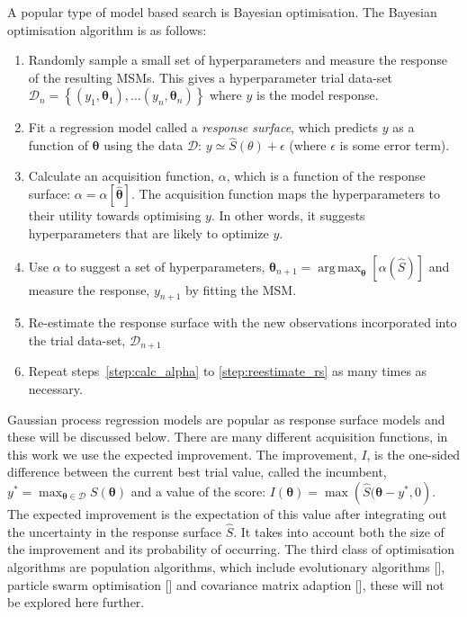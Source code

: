 \documentclass[journal=jacsat,manuscript=article]{achemso}
\DeclareMathOperator*{\argmax}{arg\,max}
\begin{document}
A popular type of model based search is Bayesian optimisation. The Bayesian optimisation algorithm is as follows: 
\begin{enumerate}
    \item Randomly sample a small set of hyperparameters and measure the response of the resulting MSMs. This gives a hyperparameter trial data-set $\mathcal{D}_{n}=\left\{(y_1, \bm{\theta}_1),  \ldots (y_n, \bm{\theta}_n) \right \}$ where $y$ is the model response.
    \item Fit a regression model called a \emph{response surface}, which predicts $y$ as a function of $\bm{\theta}$ using the data $\mathcal{D}$: $y \simeq \hat{S}(\theta) + \epsilon$ (where $\epsilon$ is some error term). 
    \item \label{step:calc_alpha} Calculate an acquisition function, $\alpha$, which is a function of the response surface: $\alpha=\alpha\left[\hat{\bm{\theta}}\right]$. The acquisition function maps the hyperparameters to their utility towards optimising $y$. In other words, it suggests hyperparameters that are likely to optimize $y$. 
    \item Use $\alpha$ to suggest a set of hyperparameters, $\bm{\theta}_{n+1} = \argmax_{\bm{\theta}}{\left[\alpha(\hat{S})\right]}$ and measure the response, $y_{n+1}$ by fitting the MSM.  
    \item \label{step:reestimate_rs} Re-estimate the response surface with the new observations incorporated into the trial data-set, $\mathcal{D}_{n+1}$
    \item Repeat steps~\ref{step:calc_alpha} to \ref{step:reestimate_rs} as many times as necessary. 
\end{enumerate}

Gaussian process regression models  are popular as response surface models and these will be discussed below. There are many different acquisition functions, in this work we use the expected improvement.  The improvement, $I$, is the one-sided difference between the current best trial value, called the incumbent, $y^{*} = \max_{\bm{\theta}\in \mathcal{D}}{S(\bm{\theta})}$ and a value of the score: $I(\bm{\theta}) = \max{\left(\hat{S}(\bm{\theta}     -y^{*}, 0\right)}$. The expected improvement is the expectation of this value after integrating out the uncertainty in the response surface $\hat{S}$. It takes into account both the size of the improvement and its probability of occurring.  The third class of optimisation algorithms are population algorithms, which include evolutionary algorithms [], particle swarm optimisation [] and covariance matrix adaption [], these will not be explored here further. 
\end{document}
